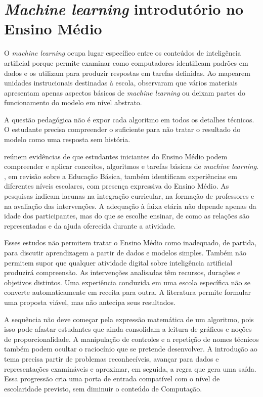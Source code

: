 \section{\textit{Machine learning} introdutório no Ensino Médio}

O \textit{machine learning} ocupa lugar específico entre os conteúdos de inteligência artificial porque permite examinar como computadores identificam padrões em dados e os utilizam para produzir respostas em tarefas definidas. Ao mapearem unidades instrucionais destinadas à escola,  observaram que vários materiais apresentam apenas aspectos básicos de \textit{machine learning} ou deixam partes do funcionamento do modelo em nível abstrato.

A questão pedagógica não é expor cada algoritmo em todos os detalhes técnicos. O estudante precisa compreender o suficiente para não tratar o resultado do modelo como uma resposta sem história.

 reúnem evidências de que estudantes iniciantes do Ensino Médio podem compreender e aplicar conceitos, algoritmos e tarefas básicas de \textit{machine learning}. , em revisão sobre a Educação Básica, também identificam experiências em diferentes níveis escolares, com presença expressiva do Ensino Médio. As pesquisas indicam lacunas na integração curricular, na formação de professores e na avaliação das intervenções. A adequação à faixa etária não depende apenas da idade dos participantes, mas do que se escolhe ensinar, de como as relações são representadas e da ajuda oferecida durante a atividade.

Esses estudos não permitem tratar o Ensino Médio como inadequado, de partida, para discutir aprendizagem a partir de dados e modelos simples. Também não permitem supor que qualquer atividade digital sobre inteligência artificial produzirá compreensão. As intervenções analisadas têm recursos, durações e objetivos distintos. Uma experiência conduzida em uma escola específica não se converte automaticamente em receita para outra. A literatura permite formular uma proposta viável, mas não antecipa seus resultados.

A sequência não deve começar pela expressão matemática de um algoritmo, pois isso pode afastar estudantes que ainda consolidam a leitura de gráficos e noções de proporcionalidade. A manipulação de controles e a repetição de nomes técnicos também podem ocultar o raciocínio que se pretende desenvolver. A introdução ao tema precisa partir de problemas reconhecíveis, avançar para dados e representações examináveis e aproximar, em seguida, a regra que gera uma saída. Essa progressão cria uma porta de entrada compatível com o nível de escolaridade previsto, sem diminuir o conteúdo de Computação.

